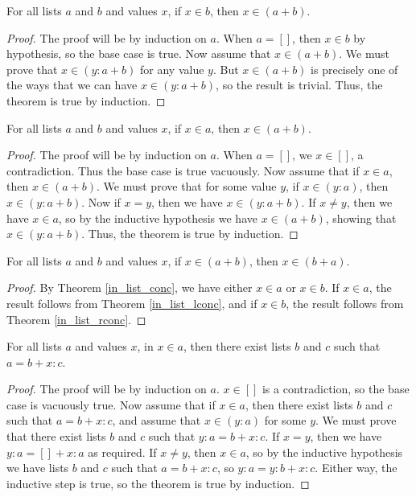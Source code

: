 \documentclass[../math.tex]{subfiles}
\begin{document}
\begin{theorem} \label{in_list_rconc}
    For all lists $a$ and $b$ and values $x$, if $x \in b$, then $x \in (a +
    b)$.
\end{theorem}
\begin{proof}
    The proof will be by induction on $a$.  When $a = []$, then $x \in b$ by
    hypothesis, so the base case is true.  Now assume that $x \in (a + b)$.  We
    must prove that $x \in (y : a + b)$ for any value $y$.  But $x \in (a + b)$
    is precisely one of the ways that we can have $x \in (y : a + b)$, so the
    result is trivial.  Thus, the theorem is true by induction.
\end{proof}

\begin{theorem} \label{in_list_lconc}
    For all lists $a$ and $b$ and values $x$, if $x \in a$, then $x \in (a +
    b)$.
\end{theorem}
\begin{proof}
    The proof will be by induction on $a$.  When $a = []$, we $x \in []$, a
    contradiction.  Thus the base case is true vacuously.  Now assume that if $x
    \in a$, then $x \in (a + b)$.  We must prove that for some value $y$, if $x
    \in (y : a)$, then $x \in (y : a + b)$.  Now if $x = y$, then we have $x \in
    (y : a + b)$.  If $x \neq y$, then we have $x \in a$, so by the inductive
    hypothesis we have $x \in (a + b)$, showing that $x \in (y : a + b)$.  Thus,
    the theorem is true by induction.
\end{proof}

\begin{theorem} \label{in_list_comm}
    For all lists $a$ and $b$ and values $x$, if $x \in (a + b)$, then $x \in (b
    + a)$.
\end{theorem}
\begin{proof}
    By Theorem \ref{in_list_conc}, we have either $x \in a$ or $x \in b$.  If $x
    \in a$, the result follows from Theorem \ref{in_list_lconc}, and if $x \in
    b$, the result follows from Theorem \ref{in_list_rconc}.
\end{proof}

\begin{theorem} \label{in_list_split}
    For all lists $a$ and values $x$, in $x \in a$, then there exist lists $b$
    and $c$ such that $a = b + x : c$.
\end{theorem}
\begin{proof}
    The proof will be by induction on $a$.  $x \in []$ is a contradiction, so
    the base case is vacuously true.  Now assume that if $x \in a$, then there
    exist lists $b$ and $c$ such that $a = b + x : c$, and assume that $x \in
    (y : a)$ for some $y$.  We must prove that there exist lists $b$ and $c$
    such that $y : a = b + x : c$.  If $x = y$, then we have $y : a = [] + x :
    a$ as required.  If $x \neq y$, then $x \in a$, so by the inductive
    hypothesis we have lists $b$ and $c$ such that $a = b + x : c$, so $y : a
    = y : b + x : c$.  Either way, the inductive step is true, so the theorem is
    true by induction.
\end{proof}
\end{document}
